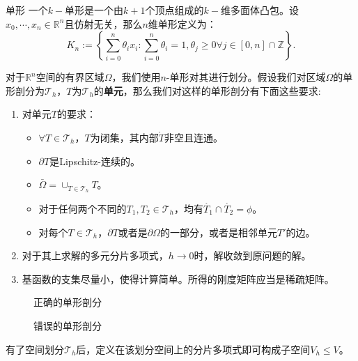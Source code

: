 \begin{definition}{单形}
    一个$k-$单形是一个由$k+1$个顶点组成的$k-$维多面体凸包。设$x_{0},\cdots,x_{n}\in\mathbb{R}^{n}$且仿射无关，那么$n$维单形定义为：
    \begin{equation}
        \label{eq:nSimplex}
        K_{n}:=\left\{\sum_{i=0}^{n}\theta_{i}x_{i}:\sum_{i=0}^{n}\theta_{i}=1,\theta_{j}\ge0\forall j\in[0,n]\cap\mathbb{Z}\right\}.
    \end{equation}
\end{definition}
对于$\mathbb{R}^{n}$空间的有界区域$\Omega$，我们使用$n$-单形对其进行划分。假设我们对区域$\Omega$的单形剖分为$\mathscr{T}_{h}$，$T$为$\mathscr{T}_{h}$的\textbf{单元}，那么我们对这样的单形剖分有下面这些要求:
\begin{enumerate}
    \item 对单元$T$的要求：
    \begin{itemize}
        \item $\forall T\in\mathscr{T}_{h}$，$T$为闭集，其内部$\mathring{T}$非空且连通。
        \item $\partial T$是Lipschitz-连续的。
        \item $\bar{\Omega}=\cup_{T\in\mathscr{T}_{h}} T$。
        \item 对于任何两个不同的$T_{1},T_{2}\in\mathscr{T}_{h}$，均有$\mathring{T_{1}}\cap\mathring{T_{2}}=\phi$。
        \item 对每个$T\in\mathscr{T}_{h}$，$\partial T$或者是$\partial\Omega$的一部分，或者是相邻单元$T'$的边。
    \end{itemize}
    \item 对于其上求解的多元分片多项式，$h\rightarrow 0$时，解收敛到原问题的解。
    \item 基函数的支集尽量小，使得计算简单。所得的刚度矩阵应当是稀疏矩阵。
\end{enumerate}
\begin{figure}[H]
    \begin{minipage}[t]{0.45\textwidth}
    \centering
    \caption{正确的单形剖分}
    \end{minipage}
    \begin{minipage}[t]{0.45\textwidth}
    \centering
    \caption{错误的单形剖分}
    \end{minipage}
\end{figure}
有了空间划分$\mathscr{T}_{h}$后，定义在该划分空间上的分片多项式即可构成子空间$V_{h}\le V$。

